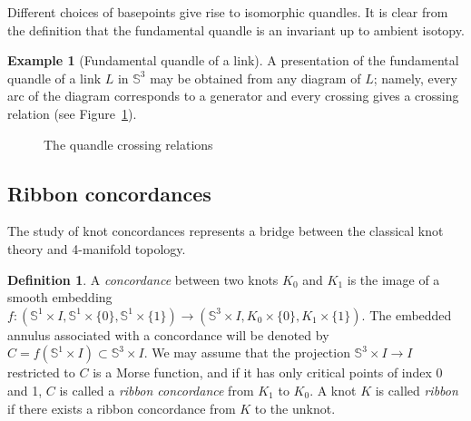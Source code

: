 \documentclass[a4paper,12pt]{amsart}
\numberwithin{equation}{section}
\theoremstyle{plain}
\theoremstyle{definition}
\newtheorem{definition}[theorem]{Definition}
\newtheorem{example}[theorem]{Example}
\newcommand{\s}{\mathbb{S}}
\newcommand{\tr}{\triangleright}
\newcommand{\tl}{\triangleleft}
\begin{document}
Different choices of basepoints give rise to isomorphic quandles.
It is clear from the definition that the fundamental quandle is an invariant up to ambient isotopy.


\begin{example}[Fundamental quandle of a link]
	A presentation of the fundamental quandle of a link $L$ in $\s^{3}$ may be obtained from any diagram of $L$; namely, every arc of the diagram corresponds to a generator and every crossing gives a crossing relation (see Figure~\ref{fig:quandle_crossing_relations}).
\end{example}

   


\begin{figure}[H]
	\caption{The quandle crossing relations}
	\label{fig:quandle_crossing_relations}
\end{figure}














\subsection{Ribbon concordances}
The study of knot concordances represents a bridge between the classical knot theory and 4-manifold topology.


\begin{definition}
	A \textit{concordance} between two knots $K_{0}$ and $K_{1}$ is the image of a smooth embedding $f\colon (\s^{1}\times I, \s^1 \times \{0\}, \s^1 \times \{1\}) \to (\s^3 \times I, K_0 \times \{0\}, K_1 \times \{1\})$.
	The embedded annulus associated with a concordance will be denoted by $C=f(\s ^{1}\times I)\subset \s ^{3}\times I$. 
	We may assume that the projection $\s ^{3}\times I\to I$ restricted to $C$ is a Morse function, and if it has only critical points of index 0 and 1, $C$ is called a \textit{ribbon concordance} from $K_1$ to $K_0$. 
	A knot $K$ is called \textit{ribbon} if there exists a ribbon concordance from $K$ to the unknot.
\end{definition}
\end{document}
